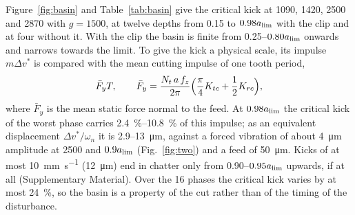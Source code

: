 Figure~\ref{fig:basin} and Table~\ref{tab:basin} give the critical kick at 1090, 1420, 2500 and \SI{2870}{\rpm} with $g=1500$, at twelve depths from 0.15 to $0.98a_{\lim}$ with the clip and at four without it. With the clip the basin is finite from 0.25--$0.80a_{\lim}$ onwards and narrows towards the limit. To give the kick a physical scale, its impulse $m\Delta v^*$ is compared with the mean cutting impulse of one tooth period,
\begin{equation}\label{eq:impulse}
  \bar F_yT,\qquad \bar F_y=\frac{N_t\,a\,f_z}{2\pi}\Bigl(\frac{\pi}{4}K_{tc}+\frac12K_{rc}\Bigr),
\end{equation}
where $\bar F_y$ is the mean static force normal to the feed. At $0.98a_{\lim}$ the critical kick of the worst phase carries \SIrange{2.4}{10.8}{\percent} of this impulse; as an equivalent displacement $\Delta v^*/\omega_n$ it is 2.9--\SI{13}{\micro\metre}, against a forced vibration of about \SI{4}{\micro\metre} amplitude at \SI{2500}{\rpm} and $0.9a_{\lim}$ (Fig.~\ref{fig:two}) and a feed of \SI{50}{\micro\metre}. Kicks of at most \SI{10}{\milli\metre\per\second} (\SI{12}{\micro\metre}) end in chatter only from 0.90--$0.95a_{\lim}$ upwards, if at all (Supplementary Material). Over the 16 phases the critical kick varies by at most \SI{24}{\percent}, so the basin is a property of the cut rather than of the timing of the disturbance.

